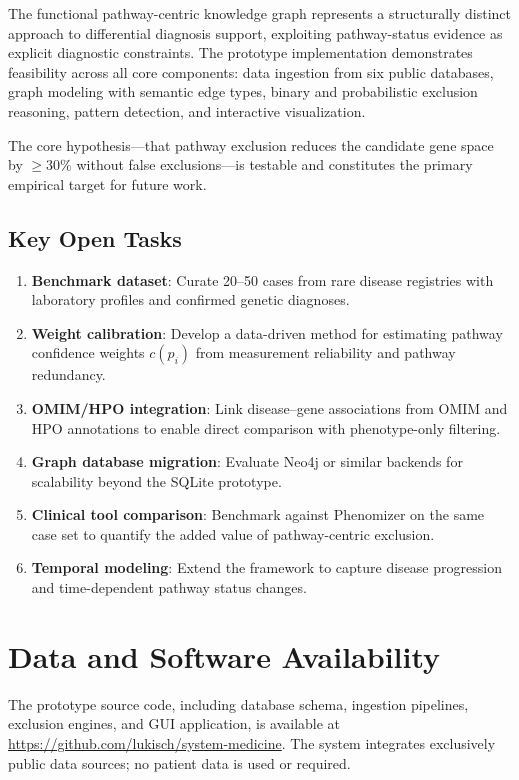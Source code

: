 \documentclass[12pt,a4paper]{article}
\begin{document}
The functional pathway-centric knowledge graph represents a structurally distinct approach to differential diagnosis support, exploiting pathway-status evidence as explicit diagnostic constraints. The prototype implementation demonstrates feasibility across all core components: data ingestion from six public databases, graph modeling with semantic edge types, binary and probabilistic exclusion reasoning, pattern detection, and interactive visualization.

The core hypothesis---that pathway exclusion reduces the candidate gene space by $\geq 30\%$ without false exclusions---is testable and constitutes the primary empirical target for future work.

\subsection{Key Open Tasks}

\begin{enumerate}
    \item \textbf{Benchmark dataset}: Curate 20--50 cases from rare disease registries with laboratory profiles and confirmed genetic diagnoses.
    \item \textbf{Weight calibration}: Develop a data-driven method for estimating pathway confidence weights $c(p_i)$ from measurement reliability and pathway redundancy.
    \item \textbf{OMIM/HPO integration}: Link disease--gene associations from OMIM and HPO annotations to enable direct comparison with phenotype-only filtering.
    \item \textbf{Graph database migration}: Evaluate Neo4j or similar backends for scalability beyond the SQLite prototype.
    \item \textbf{Clinical tool comparison}: Benchmark against Phenomizer on the same case set to quantify the added value of pathway-centric exclusion.
    \item \textbf{Temporal modeling}: Extend the framework to capture disease progression and time-dependent pathway status changes.
\end{enumerate}

\section*{Data and Software Availability}

The prototype source code, including database schema, ingestion pipelines, exclusion engines, and GUI application, is available at \url{https://github.com/lukisch/system-medicine}. The system integrates exclusively public data sources; no patient data is used or required.
\end{document}
